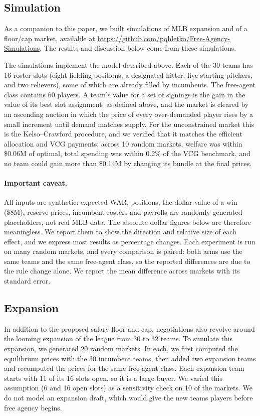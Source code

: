 \documentclass{article}
\begin{document}
\subsection{Simulation}
As a companion to this paper, we built simulations of MLB expansion and of a floor/cap market, available at \url{https://github.com/pqhletko/Free-Agency-Simulations}. The results and discussion below come from these simulations.

The simulations implement the model described above. Each of the 30 teams has 16 roster slots (eight fielding positions, a designated hitter, five starting pitchers, and two relievers), some of which are already filled by incumbents. The free-agent class contains 60 players. A team's value for a set of signings is the gain in the value of its best slot assignment, as defined above, and the market is cleared by an ascending auction in which the price of every over-demanded player rises by a small increment until demand matches supply. For the unconstrained market this is the Kelso--Crawford procedure, and we verified that it matches the efficient allocation and VCG payments: across 10 random markets, welfare was within \$0.06M of optimal, total spending was within 0.2\% of the VCG benchmark, and no team could gain more than \$0.14M by changing its bundle at the final prices.

\paragraph{Important caveat.} All inputs are synthetic: expected WAR, positions, the dollar value of a win (\$8M), reserve prices, incumbent rosters and payrolls are randomly generated placeholders, not real MLB data. The absolute dollar figures below are therefore meaningless. We report them to show the direction and relative size of each effect, and we express most results as percentage changes. Each experiment is run on many random markets, and every comparison is paired: both arms use the same teams and the same free-agent class, so the reported differences are due to the rule change alone. We report the mean difference across markets with its standard error.

\subsection{Expansion}
In addition to the proposed salary floor and cap, negotiations also revolve around the looming expansion of the league from 30 to 32 teams. To simulate this expansion, we generated 20 random markets. In each, we first computed the equilibrium prices with the 30 incumbent teams, then added two expansion teams and recomputed the prices for the same free-agent class. Each expansion team starts with 11 of its 16 slots open, so it is a large buyer. We varied this assumption (6 and 16 open slots) as a sensitivity check on 10 of the markets. We do not model an expansion draft, which would give the new teams players before free agency begins.
\end{document}
